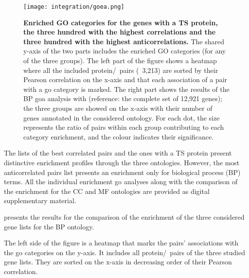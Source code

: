     \begin{sidewaysfigure}
        \texttt{[image: integration/goea.png]}\centering
        \vspace{-3mm}
        \caption[Enriched GO categories for the genes with a TS protein and
        the three hundred with the highest correlations
        and anticorrelations]{\label{fig:goares}%
        \textbf{Enriched GO categories for the genes with a TS protein,
        the three hundred with the highest correlations and
        the three hundred with the highest anticorrelations.}
        The shared y-axis of the two parts includes the enriched GO categories
        (for any of the three groups).
        The left part of the figure shows
        a heatmap where all the included protein/\mRNA\ pairs (\ie\ 3,213)
        are sorted by their Pearson correlation on the x-axis and
        that each association of a pair with a \gls{go} category is marked.
        The right part shows the results of the BP \gls{goa} analysis
        with  (reference: the complete set of 12,921 genes);
        the three groups are showed on the x-axis with their number of genes
        annotated in the considered ontology.
        For each dot, the size represents the ratio of pairs within each group
        contributing to each category enrichment,
        and the colour indicates their significance.
        }
    \end{sidewaysfigure}


The lists of the best correlated pairs and
the ones with a \gls{TS} protein present distinctive enrichment profiles
through the three ontologies.
However, the most anticorrelated pairs list presents
an enrichment only for biological process (BP) terms.
All the individual enrichment \gls{go} analyses
along with the comparison of the enrichment for the CC and MF ontologies
are provided as digital supplementary material.\mybr\

 presents the results for
the comparison of the enrichment of the three considered gene lists
for the BP ontology.\mybr\

The left side of the figure is a heatmap
that marks the pairs' associations with the \gls{go} categories on the y-axis.
It includes all protein/\mRNA\ pairs of the three studied gene lists.
They are sorted on the x-axis in decreasing order of their Pearson correlation.\mybr\

